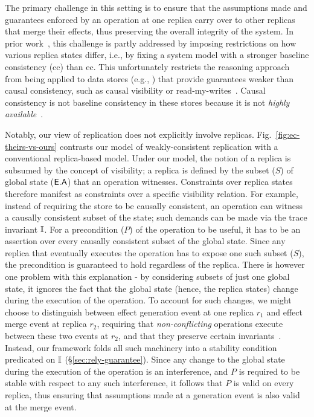 The primary challenge in this setting is to ensure that the
assumptions made and guarantees enforced by an operation at one
replica carry over to other replicas that merge their effects, thus
preserving the overall integrity of the system.  In prior
work~\cite{lbc16,gotsmanpopl16}, this challenge is partly addressed by
imposing restrictions on how various replica states differ, i.e., by
fixing a system model with a stronger baseline consistency ({\sc cc})
than {\sc ec}. This unfortunately restricts the reasoning approach
from being applied to data stores (e.g., \cite{bayou,pldi15}) that provide
guarantees weaker than causal consistency, such as causal visibility
or read-my-writes~\cite{zoo}. Causal consistency is not baseline
consistency in these stores because it is not \emph{highly
  available}~\cite{bailishat}.

Notably, our view of replication does not explicitly involve replicas.
Fig.~\ref{fig:ec-theirs-vs-ours} contrasts our model of
weakly-consistent replication with a conventional replica-based model.
Under our model, the notion of a replica is subsumed by the concept of
visibility; a replica is defined by the subset ($S$) of global state
($\textsf{E}.\textsf{A}$) that an operation witnesses. Constraints over replica states
therefore manifest as constraints over a specific visibility relation.
For example, instead of requiring the store to be causally consistent,
an operation can witness a causally consistent subset of the state;
such demands can be made via the trace invariant $\mathbb{I}$. For a
precondition ($P$) of the operation to be useful, it has to be an
assertion over every causally consistent subset of the global state.
Since any replica that eventually executes the operation has to expose
one such subset ($S$), the precondition is guaranteed to hold
regardless of the replica. There is however one problem with this
explanation - by considering subsets of just one global state, it
ignores the fact that the global state (hence, the replica states)
change during the execution of the operation. To account for such
changes, we might choose to distinguish between effect generation
event at one replica $r_1$ and effect merge event at replica $r_2$,
requiring that \emph{non-conflicting} operations execute between these
two events at $r_2$, and that they preserve certain
invariants~\cite{gotsmanpopl16}.  Instead, our framework folds all such
machinery into a stability condition predicated on $\mathbb{I}$
(\S\ref{sec:rely-guarantee}).  Since any change to the global state
during the execution of the operation is an interference, and $P$ is
required to be stable with respect to any such interference, it
follows that $P$ is valid on every replica, thus ensuring that
assumptions made at a generation event is also valid at the merge
event.

